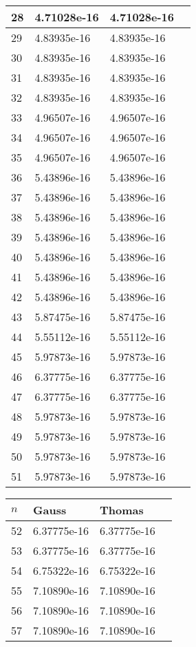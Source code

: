 \documentclass{article}
\begin{document}
\begin{table}[H]
{\begin{tabular}{|l|l|l|l|}
28 & 4.71028e-16 & 4.71028e-16 \\ \hline
29 & 4.83935e-16 & 4.83935e-16 \\ \hline
30 & 4.83935e-16 & 4.83935e-16 \\ \hline
31 & 4.83935e-16 & 4.83935e-16 \\ \hline
32 & 4.83935e-16 & 4.83935e-16 \\ \hline
33 & 4.96507e-16 & 4.96507e-16 \\ \hline
34 & 4.96507e-16 & 4.96507e-16 \\ \hline
35 & 4.96507e-16 & 4.96507e-16 \\ \hline
36 & 5.43896e-16 & 5.43896e-16 \\ \hline
37 & 5.43896e-16 & 5.43896e-16 \\ \hline
38 & 5.43896e-16 & 5.43896e-16 \\ \hline
39 & 5.43896e-16 & 5.43896e-16 \\ \hline
40 & 5.43896e-16 & 5.43896e-16 \\ \hline
41 & 5.43896e-16 & 5.43896e-16 \\ \hline
42 & 5.43896e-16 & 5.43896e-16 \\ \hline
43 & 5.87475e-16 & 5.87475e-16 \\ \hline
44 & 5.55112e-16 & 5.55112e-16 \\ \hline
45 & 5.97873e-16 & 5.97873e-16 \\ \hline
46 & 6.37775e-16 & 6.37775e-16 \\ \hline
47 & 6.37775e-16 & 6.37775e-16 \\ \hline
48 & 5.97873e-16 & 5.97873e-16 \\ \hline
49 & 5.97873e-16 & 5.97873e-16 \\ \hline
50 & 5.97873e-16 & 5.97873e-16 \\ \hline
51 & 5.97873e-16 & 5.97873e-16 \\ \hline
\end{tabular}
}
\parbox{.45\linewidth}{
\begin{tabular}{|l|l|l|l|}
\hline
$n$ & Gauss & Thomas \\ \hline
52 & 6.37775e-16 & 6.37775e-16 \\ \hline
53 & 6.37775e-16 & 6.37775e-16 \\ \hline
54 & 6.75322e-16 & 6.75322e-16 \\ \hline
55 & 7.10890e-16 & 7.10890e-16 \\ \hline
56 & 7.10890e-16 & 7.10890e-16 \\ \hline
57 & 7.10890e-16 & 7.10890e-16 \\ \hline

\end{tabular}}
\end{table}
\end{document}
